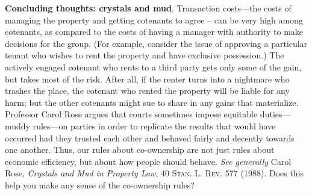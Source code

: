 \item \textbf{Concluding thoughts: crystals and mud}. Transaction
costs---the costs of managing the property and getting cotenants to agree --
can be very high among cotenants, as compared to the costs of having a manager
with authority to make decisions for the group. (For example, consider the
issue of approving a particular tenant who wishes to rent the property and have
exclusive possession.) The actively engaged cotenant who rents to a third
party gets only some of the gain, but takes most of the risk. After all, if
the renter turns into a nightmare who trashes the place, the cotenant who
rented the property will be liable for any harm; but the other cotenants might
sue to share in any gains that materialize. Professor Carol Rose argues that
courts sometimes impose equitable duties---muddy rules---on parties in order
to replicate the results that would have occurred had they trusted each other
and behaved fairly and decently towards one another. Thus, our rules about
co-ownership are not just rules about economic efficiency, but about how people
should behave. \textit{See generally} Carol Rose, \textit{Crystals and Mud in
Property Law}, 40 \textsc{Stan. L. Rev.} 577 (1988). Does this help you make
any sense of the co-ownership rules?

